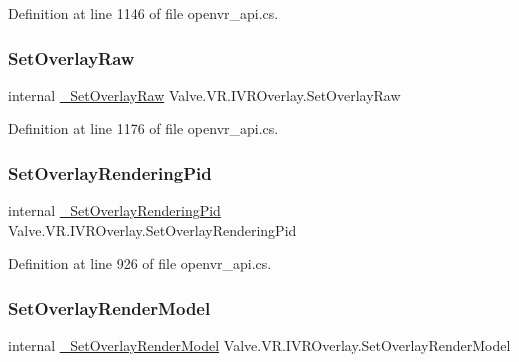 Definition at line 1146 of file openvr\+\_\+api.\+cs.

\mbox{\label{struct_valve_1_1_v_r_1_1_i_v_r_overlay_a23b09badbcb891123c44ca7ad8e369ac}} 
\subsubsection{\texorpdfstring{SetOverlayRaw}{SetOverlayRaw}}
{\footnotesize\ttfamily internal \mbox{\hyperlink{struct_valve_1_1_v_r_1_1_i_v_r_overlay_af2328af182be33f52a04f9a47242b811}{\+\_\+\+Set\+Overlay\+Raw}} Valve.\+V\+R.\+I\+V\+R\+Overlay.\+Set\+Overlay\+Raw}



Definition at line 1176 of file openvr\+\_\+api.\+cs.

\mbox{\label{struct_valve_1_1_v_r_1_1_i_v_r_overlay_a2a49855e3082c6daab777189a5644cbe}} 
\subsubsection{\texorpdfstring{SetOverlayRenderingPid}{SetOverlayRenderingPid}}
{\footnotesize\ttfamily internal \mbox{\hyperlink{struct_valve_1_1_v_r_1_1_i_v_r_overlay_a8f638ca89f20888242e2232fd3e0c0e2}{\+\_\+\+Set\+Overlay\+Rendering\+Pid}} Valve.\+V\+R.\+I\+V\+R\+Overlay.\+Set\+Overlay\+Rendering\+Pid}



Definition at line 926 of file openvr\+\_\+api.\+cs.

\mbox{\label{struct_valve_1_1_v_r_1_1_i_v_r_overlay_a5bec8ad5f2b4ea1efb6feeb8083623f1}} 
\subsubsection{\texorpdfstring{SetOverlayRenderModel}{SetOverlayRenderModel}}
{\footnotesize\ttfamily internal \mbox{\hyperlink{struct_valve_1_1_v_r_1_1_i_v_r_overlay_a1bbe01ba8283e551d3d818e31199e39b}{\+\_\+\+Set\+Overlay\+Render\+Model}} Valve.\+V\+R.\+I\+V\+R\+Overlay.\+Set\+Overlay\+Render\+Model}




